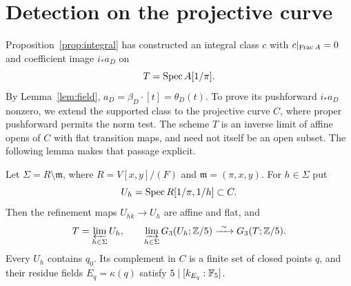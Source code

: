 \section{Detection on the projective curve}\label{sec:detection}

Proposition~\ref{prop:integral} has constructed an integral class $c$
with $c|_{\operatorname{Frac} A}=0$ and coefficient image $i_*a_D$ on
\[
 T=\operatorname{Spec} A[1/\pi].
\]
By Lemma~\ref{lem:field}, $a_D=\beta_D\cdot[t]=\theta_D(t)$.
To prove its pushforward $i_*a_D$ nonzero, we extend the supported
class to the projective curve $C$, where proper pushforward permits
the norm test. The scheme $T$ is an inverse limit of
affine opens of $C$ with flat transition maps, and need not itself
be an open subset. The following lemma makes that passage explicit.

\begin{lemma}\label{lem:opens}
Let $\Sigma=R\setminus\mathfrak m$, where
$R=V[x,y]/(F)$ and $\mathfrak m=(\pi,x,y)$.  For $h\in\Sigma$ put
\[
 U_h=\operatorname{Spec} R[1/\pi,1/h]\subset C.
\]
Then the refinement maps $U_{hk}\to U_h$ are affine and flat, and
\begin{equation}\label{eq:continuity}
 T=\varprojlim_{h\in\Sigma}U_h,
 \qquad
 \varinjlim_{h\in\Sigma}G_3(U_h;\mathbb Z/5)
   \xrightarrow{\ \sim\ }G_3(T;\mathbb Z/5).
\end{equation}
Every $U_h$ contains $q_0$.  Its complement in $C$ is a finite set of
closed points $q$, and their residue fields $E_q=\kappa(q)$ satisfy
$5\mid[k_{E_q}:\mathbb F_5]$.
\end{lemma}

